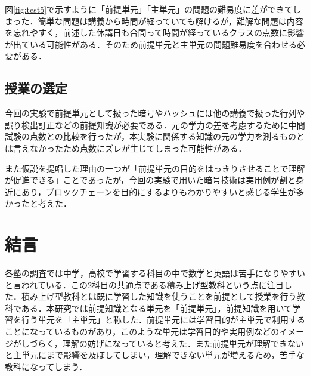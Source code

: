 \documentclass[a4j,12pt]{jsarticle}
\begin{document}
図\ref{fig:test5}で示すように「前提単元」「主単元」の問題の難易度に差ができてしまった．簡単な問題は講義から時間が経っていても解けるが，難解な問題は内容を忘れやすく，前述した休講日も合間って時間が経っているクラスの点数に影響が出ている可能性がある．そのため前提単元と主単元の問題難易度を合わせる必要がある．
\begin{table}[H]
\centering
\caption{前提知識を用いた単元の平均点の比較}
\label{fig:test5}
\end{table}



\subsection{授業の選定}
今回の実験で前提単元として扱った暗号やハッシュには他の講義で扱った行列や誤り検出訂正などの前提知識が必要である．元の学力の差を考慮するために中間試験の点数との比較を行ったが，本実験に関係する知識の元の学力を測るものとは言えなかったため点数にズレが生じてしまった可能性がある．

また仮説を提唱した理由の一つが「前提単元の目的をはっきりさせることで理解が促進できる」ことであったが，今回の実験で用いた暗号技術は実用例が割と身近にあり，ブロックチェーンを目的にするよりもわかりやすいと感じる学生が多かったと考えた．



\newpage
\section{結言}
各塾の調査では中学，高校で学習する科目の中で数学と英語は苦手になりやすいと言われている\cite{1}．この2科目の共通点である積み上げ型教科という点に注目した．積み上げ型教科とは既に学習した知識を使うことを前提として授業を行う教科である．本研究では前提知識となる単元を「前提単元」，前提知識を用いて学習を行う単元を「主単元」と称した．前提単元には学習目的が主単元で利用することになっているものがあり，このような単元は学習目的や実用例などのイメージがしづらく，理解の妨げになっていると考えた．また前提単元が理解できないと主単元にまで影響を及ぼしてしまい，理解できない単元が増えるため，苦手な教科になってしまう．
\end{document}

